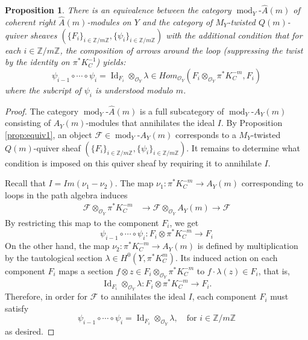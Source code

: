\documentclass[11pt]{amsart}
\theoremstyle{plain}
\newtheorem{prop}[theorem]{Proposition}
\theoremstyle{definition}
\theoremstyle{remark}
\def\O{\mathcal{O}}
\def\m{\mu}
\def\m{\mathcal}
\def\zm{\mathbb{Z}/m\mathbb{Z}}
\def\wAm{\widehat{A}(m)}
\def\mod{\operatorname{mod}}
\begin{document}
\begin{prop}\label{prop:equiv3}
There is an equivalence between the category $\mod_Y\!\text{-}\wAm$ of coherent right $\wAm$-modules on $Y$ and the category of $M_Y$-twisted $Q(m)$-quiver sheaves $(\{F_i\}_{i\in \zm}, \{\psi_i\}_{i\in \zm} )$ with the additional condition that for each $i\in \zm$, the composition of arrows around the loop (suppressing the twist by the identity on $\pi^*K_C^{-1}$) yields:
\[\psi_{i-1}\circ \cdots \circ \psi_i = \operatorname{Id}_{F_i}\otimes_{\O_Y} \lambda  \in Hom_{\O_Y}(F_i\otimes_{\O_Y} \pi^*K_C^{-m}, F_i )\]
where the subcript of $\psi_i$ is understood modulo $m$.
\end{prop}

\begin{proof}
    The category $\mod_Y\!\text{-}\wAm$ is a full subcategory of $\mod_Y\!\text{-}A_Y(m)$ consisting of $A_Y(m)$-modules that annihilates the ideal $I$. By Proposition \ref{prop:equiv1}, an object $\m F\in \mod_Y\!\text{-}A_Y(m)$ corresponds to a $M_Y$-twisted $Q(m)$-quiver sheaf $(\{F_i\}_{i\in \zm}, \{\psi_i\}_{i\in \zm})$. It remains to determine what condition is imposed on this quiver sheaf by requiring it to annihilate $I$. 

    Recall that $I=Im(\nu_1-\nu_2)$. 
    The map $\nu_1: \pi^*K_C^{-m}\to A_Y(m)$ corresponding to loops in the path algebra induces
    \begin{align*}
    \m  F\otimes_{\O_Y} \pi^*K_C^{-m} &\to \m F\otimes_{\O_Y} A_Y(m) \to \m F
    \end{align*}
    By restricting this map to the component $F_i$, we get
    \[\psi_{i-1}\circ \cdots \circ \psi_i : F_i\otimes \pi^*K_C^{-m} \to F_i\]
    On the other hand, the map $\nu_2: \pi^*K_C^{-m}\to A_Y(m)$ is defined by multiplication by the tautological section $\lambda\in H^0(Y, \pi^*K_C^m)$. 
    Its induced action on each component $F_i$ maps a section $f\otimes z\in F_i\otimes_{\O_Y}\pi^*K_C^{-m}$ to $f\cdot \lambda(z)\in F_i$, that is, 
    \[\operatorname{Id}_{F_i}\otimes _{\O_Y}\lambda: F_i\otimes \pi^*K_C^{-m} \to F_i.\]
    Therefore, in order for $\m F$ to annihilates the ideal $I$, each component $F_i$ must satisfy
    \[\psi_{i-1}\circ \cdots \circ \psi_i = \operatorname{Id}_{F_i}\otimes_{\O_Y} \lambda  ,\quad \textrm{for } i\in \zm\]
    as desired.  
\end{proof}
\end{document}
